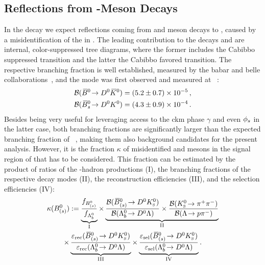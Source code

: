 \subsection{\texorpdfstring{\KS}{Neutral Kaon} Reflections from \texorpdfstring{\bquark}{b}-Meson Decays}
\label{sec:bkgs_ks}
In the decay \decay{\Lb}{\Dz\Lz} we expect \glspl{reflection} coming from \Bd and \Bs meson decays to \Dz\KS, caused by a misidentification of the \pip in \decay{\KS}{\pip\pim}.
The leading contribution to the decays \decay{\Bdb}{\Dz\KS} and \decay{\Bsb}{\Dz\KS} are internal, color-suppressed tree diagrams, where the former includes the Cabibbo suppressed \decay{\bquark}{\cquark\squark\uquarkbar} transition and the latter the Cabibbo favored \decay{\bquark}{\cquark\dquark\uquarkbar} transition.
The respective \Bd branching fraction is well established, measured by the \gls{babar} and \gls{belle} collaborations~\cite{BdToDK1,BdToDK2}, and the \Bs mode was first observed and measured at \lhcb~\cite{BsToDK}:
\begin{align*}
    \mathcal{B}({{\kern 0.18em\overline{\kern -0.18em B}{}}{}^0}\!\rightarrow {\ensuremath{{D}^0}}{\ensuremath{{\kern 0.2em\overline{\kern -0.2em K}{}}{}^0}}) &= (5.2 \pm 0.7) \times 10^{-5} \,,\\
    \mathcal{B}({{\kern 0.18em\overline{\kern -0.18em B}{}}{}^0_{s}}\!\rightarrow {\ensuremath{{D}^0}}{\ensuremath{{K}^0}}) &= (4.3 \pm 0.9) \times 10^{-4} \,.
\end{align*}
Besides being very useful for leveraging access to the \gls{ckm} phase $\gamma$ and even $\phi_{s}$ in the latter case, both branching fractions are significantly larger than the expected branching fraction of \decay{\Lb}{\Dz\Lz}~\cite{brLbToDzLz_pred},
making them also background candidates for the present analysis.
However, it is the fraction $\kappa$ of misidentified \Bd and \Bs mesons in the signal region of \decay{\Lb}{\Dz\Lz} that has to be considered.
This fraction can be estimated by the product of ratios of the \bquark-hadron productions (I), the branching fractions of the respective decay modes (II), the reconstruction efficiencies (III), and the selection efficiencies (IV):
\begin{multline*}
    \kappa(\PB^0_{(\squark)}) := \underbrace{\frac{f_{\PB^0_{(\squark)}}}{f_{\Lb}}}_{\text{I}} \times \underbrace{\frac{\mathcal{B}(\decay{\Bbar{}^0_{(\squark)}}{\Dz\KS})}{\mathcal{B}(\decay{\Lb}{\Dz\Lz})} \times \frac{\mathcal{B}(\decay{\KS}{\pip\pim})}{\mathcal{B}(\decay{\Lz}{\proton\pim})}}_{\text{II}} \\
    \times \underbrace{\frac{\varepsilon_\text{rec}(\decay{\Bbar{}^0_{(\squark)}}{\Dz\KS})}{\varepsilon_\text{rec}(\decay{\Lb}{\Dz\Lz})}}_{\text{III}} \times \underbrace{\frac{\varepsilon_\text{sel}(\decay{\Bbar{}^0_{(\squark)}}{\Dz\KS})}{\varepsilon_\text{sel}(\decay{\Lb}{\Dz\Lz})}}_{\text{IV}}.
\end{multline*}

